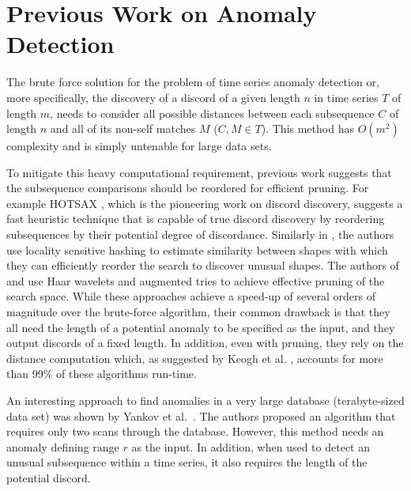 \documentclass{sig-alternate}
\begin{document}
\section{Previous Work on Anomaly\\ Detection}
The brute force solution for the problem of time series anomaly detection or, more specifically, the discovery of a discord of a given length $n$ in time series $T$ of length $m$, needs to consider all possible distances between each subsequence $C$ of length $n$ and all of its non-self matches $M$ ($C,M \in T$). This method has $O(m^{2})$ complexity and is simply untenable for large data sets. 

To mitigate this heavy computational requirement, previous work suggests that the subsequence comparisons should be reordered for efficient pruning. For example HOTSAX \cite{hot_sax}, which is the pioneering work on discord discovery, suggests a fast heuristic technique that is capable of true discord discovery by reordering subsequences by their potential degree of discordance. Similarly in \cite{hashing}, the authors use locality sensitive hashing to estimate similarity between shapes with which they can efficiently reorder the search to discover unusual shapes. The authors of \cite{haar_1} and \cite{haar_2} use Haar wavelets and augmented tries to achieve effective pruning of the search space. While these approaches achieve a speed-up of several orders of magnitude over the brute-force algorithm, their common drawback is that they all need the length of a potential anomaly to be specified as the input, and they output discords of a fixed length. In addition, even with pruning, they rely on the distance computation which, as suggested by Keogh et al. \cite{hot_sax}, accounts for more than 99\% of these algorithms run-time.  

An interesting approach to find anomalies in a very large database (terabyte-sized data set) was shown by Yankov et al.~\cite{disk}. The authors proposed an algorithm that requires only two scans through the database. However, this method needs an anomaly defining range $r$ as the input. In addition, when used to detect an unusual subsequence within a time series, it also requires the length of the potential discord. 
\end{document}
